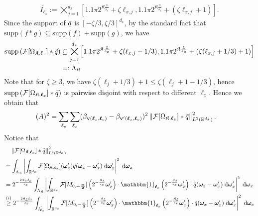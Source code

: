 \documentclass[11pt]{article}
\newcommand{\one}{\mathbbm{1}}
\newcommand{\bv}{\mathbf v}
\newcommand{\bomega}{\boldsymbol{\omega}}
\newcommand{\calF}{\mathcal{F}}
\newcommand{\bl}{{\boldsymbol\ell}}
\newcommand{\0}{\mathbf{0}}
\begin{document}
\begin{appendix}
\begin{align}
    \tilde{I_{\bl_x}} := \bigtimes_{j=1}^{d_x}\left[1.1\pi 2^{\mathfrak{K} \frac{\underline{s}}{s_x}} + \zeta \ell_{x,j}, 1.1\pi 2^{\mathfrak{K} \frac{\underline{s}}{s_x}} + (\zeta \ell_{x,j} + 1)\right].
\end{align}
Since the support of $\Tilde{q}$ is $[-\zeta/3, \zeta/3]^{d_x}$, by the standard fact that $\mathrm{supp}(f\ast g)\subseteq \mathrm{supp}(f) + \mathrm{supp}(g)$, we have
\begin{align}\label{eq:support_F_conv_tilde_q}
    \mathrm{supp}\left( \calF[\Omega_{\mathfrak{K},\bl_x}]  \ast \Tilde{q} \right) &\subseteq \bigtimes_{j=1}^{d_x}\left[1.1\pi 2^{\mathfrak{K} \frac{\underline{s}}{s_x}} + \zeta (\ell_{x,j} - 1/3), 1.1\pi 2^{\mathfrak{K} \frac{\underline{s}}{s_x}} + (\zeta (\ell_{x,j} + 1/3) + 1)\right] \nonumber \\
    &=: \Lambda_\mathfrak{K}
\end{align}
Note that for $\zeta \geq 3$, we have $\zeta(\ell_j + 1/3) + 1 \leq \zeta(\ell_j + 1 - 1/3)$, hence $\mathrm{supp}\left( \calF[\Omega_{\mathfrak{K},\bl_x}]  \ast \Tilde{q} \right)$ is pairwise disjoint with respect to different $\bl_x$. 
Hence we obtain that
\begin{align*}
    (A)^2 &= \sum_{\bl_o}\sum_{\bl_x}(\beta_{\bv(\bl_x,\bl_o)} - \beta_{\bv'(\bl_x,\bl_o)})^2 \left\| \calF[\Omega_{\mathfrak{K},\bl_x}]   \ast \Tilde{q}\right\|^2_{L^2(\mathbb{R}^{d_x})}.
\end{align*}
Notice that
\begin{align}\label{eq:F_conv_tilde_q_1}
    &\quad \left\|\calF[\Omega_{\mathfrak{K},\bl_x}]   \ast \Tilde{q}\right\|_{L^2(\mathbb{R}^{d_x})}^2 \nonumber \\
    &= \int_{\Lambda_\mathfrak{K}} \left|\int_{\mathbb{R}^{d_x}} \calF[\Omega_{\mathfrak{K},\bl_x}](\bomega_x^\prime) \tilde{q}(\bomega_x - \bomega_x^\prime) \;\mathrm{d}\bomega_x^\prime\right|^2 \;\mathrm{d}\bomega_x \nonumber \\
    &= 2^{-\frac{2\mathfrak{K}\underline{s}d_x}{s_x}} \int_{\Lambda_\mathfrak{K}} \left|\int_{\mathbb{R}^{d_x}} \calF[M_{0,\boldsymbol{-\frac{\mathfrak{m}}{2}}}]\left(2^{-\frac{\mathfrak{K}\underline{s}}{s_x}} \bomega_x^\prime \right) \cdot \one_{\bl_x} \left(2^{-\frac{\mathfrak{K}\underline{s}}{s_x}} \bomega_x^\prime \right) \cdot \tilde{q}(\bomega_x - \bomega_x^\prime) \;\mathrm{d}\bomega_x^\prime\right|^2 \;\mathrm{d}\bomega_x \nonumber \\
    &\stackrel{(i)}{\geq} 2^{-\frac{2\mathfrak{K}\underline{s}d_x}{s_x}} \int_{\tilde{I_{\bl_x}}} \left|\int_{\mathbb{R}^{d_x}} \calF[M_{0,\boldsymbol{-\frac{\mathfrak{m}}{2}}}]\left(2^{-\frac{\mathfrak{K}\underline{s}}{s_x}} \bomega_x^\prime \right) \cdot \one_{\bl_x} \left(2^{-\frac{\mathfrak{K}\underline{s}}{s_x}} \bomega_x^\prime \right) \cdot \tilde{q}(\bomega_x - \bomega_x^\prime) \;\mathrm{d}\bomega_x^\prime\right|^2 \;\mathrm{d}\bomega_x \nonumber \\

\end{align}
\end{appendix}
\end{document}
